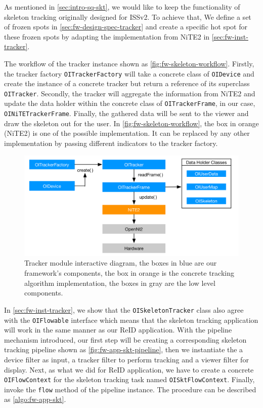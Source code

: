 As mentioned in \autoref{sec:intro-sq-skt}, we would like to keep the
functionality of skeleton tracking originally designed for ISSv2. To achieve
that, We define a set of frozen spots in \autoref{sec:fw-design-spec-tracker}
and create a specific hot spot for these frozen spots by adapting the
implementation from NiTE2 in \autoref{sec:fw-inst-tracker}.

The workflow of the tracker instance shown as \autoref{fig:fw-skeleton-workflow}.
Firstly, the tracker factory \texttt{OITrackerFactory} will take a concrete
class of \texttt{OIDevice} and create the instance of a concrete tracker but
return a reference of its superclass \texttt{OITracker}. Secondly, the tracker
will aggregate the information from NiTE2 and update the data holder within
the concrete class of \texttt{OITrackerFrame}, in our case,
\texttt{OINiTETrackerFrame}. Finally, the gathered data will be sent to
the viewer and draw the skeleton out for the user.
In \autoref{fig:fw-skeleton-workflow}, the box in orange (NiTE2) is one of the
possible implementation. It can be replaced by any other implementation by
passing different indicators to the tracker factory.

\begin{figure}
    \includegraphics[width=\linewidth]{figures/framework_oitracker_workflow.png}
    \caption[Tracker module interactive diagram]
    {Tracker module interactive diagram,
        the boxes in blue are our framework's components, the box in
        orange is the concrete tracking algorithm implementation, the boxes in
        gray are the low level components.}
    \label{fig:fw-skeleton-workflow}
\end{figure}

In \autoref{sec:fw-inst-tracker}, we show that the \texttt{OISkeletonTracker}
class also agree with the \texttt{OIFlowable} interface which means that the
skeleton tracking application will work in the same manner as our ReID
application. With the pipeline mechanism introduced, our first step will be
creating a corresponding skeleton tracking pipeline shown as
\autoref{fig:fw-app-skt-pipeline}, then we instantiate the a device filter as
input, a tracker filter to perform tracking and a viewer filter for display.
Next, as what we did for ReID application, we have to create a concrete
\texttt{OIFlowContext} for the skeleton tracking task named
\texttt{OISktFlowContext}.
Finally, invoke the \texttt{flow} method of the pipeline instance.
The procedure can be described as \autoref{algo:fw-app-skt}.

